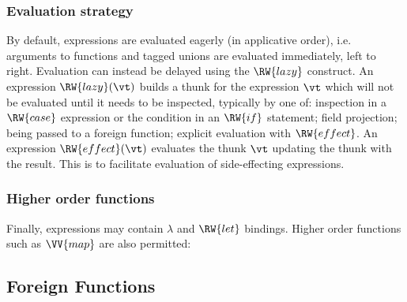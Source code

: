 \subsubsection*{Evaluation strategy}

By default, expressions are evaluated eagerly (in applicative order),
i.e. arguments to functions and tagged unions are evaluated
immediately, left to right. Evaluation can instead be delayed using
the $\RW{lazy}$ construct. An expression $\RW{lazy}(\vt)$ 
builds a thunk for the expression $\vt$ which will not be
evaluated until it needs to be inspected, typically by one of:
inspection in a $\RW{case}$ expression or the condition in an
  $\RW{if}$ statement;
field projection;
being passed to a foreign function;
explicit evaluation with $\RW{effect}$.%
An expression $\RW{effect}(\vt)$ evaluates the thunk $\vt$ 
updating the thunk with the result. This is to facilitate evaluation of
side-effecting expressions.

\subsubsection*{Higher order functions}

Finally, expressions may contain $\lambda$ and $\RW{let}$
bindings. Higher order functions such as $\VV{map}$ are also permitted:


\subsection{Foreign Functions}


